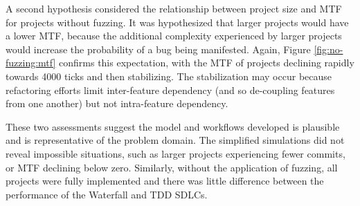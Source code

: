 \documentclass{llncs}
\begin{document}
A second hypothesis considered the relationship between project size and MTF for projects without fuzzing. It was
hypothesized that larger projects would have a lower MTF, because the additional complexity experienced by larger
projects would increase the probability of a bug being manifested.  Again, Figure \ref{fig:no-fuzzing:mtf} confirms this
expectation, with the MTF of projects declining rapidly towards 4000 ticks and then stabilizing.  The stabilization may
occur because refactoring efforts limit inter-feature dependency (and so de-coupling features from one another) but not
intra-feature dependency.

These two assessments suggest the model and workflows developed is plausible and is representative of the problem
domain.  The simplified simulations did not reveal impossible situations, such as larger projects experiencing fewer
commits, or MTF declining below zero.  Similarly, without the application of fuzzing, all projects were fully
implemented and there was little difference between the performance of the Waterfall and TDD SDLCs.

 
\end{document}
